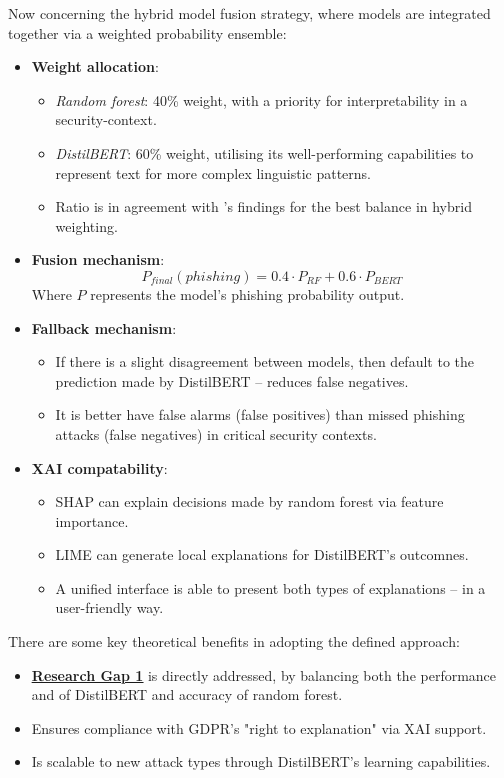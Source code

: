 \noindent Now concerning the hybrid model fusion strategy, where models are integrated together via a weighted probability ensemble:

\begin{itemize}
  \item \textbf{Weight allocation}:
  \begin{itemize}
    \item \textit{Random forest}: 40\% weight, with a priority for interpretability in a security-context.
    \item \textit{DistilBERT}: 60\% weight, utilising its well-performing capabilities to represent text for more complex linguistic patterns.
    \item Ratio is in agreement with \cite{alzahrani2024explainable}'s findings for the best balance in hybrid weighting.
  \end{itemize}
  \item \textbf{Fusion mechanism}:
  \begin{equation}
    P_{final}(phishing) = 0.4 \cdot P_{RF} + 0.6 \cdot P_{BERT}
  \end{equation}
  Where \( P \) represents the model's phishing probability output.
  \item \textbf{Fallback mechanism}:
  \begin{itemize}
    \item If there is a slight disagreement between models, then default to the prediction made by DistilBERT -- reduces false negatives.
    \item It is better have false alarms (false positives) than missed phishing attacks (false negatives) in critical security contexts.
  \end{itemize}
  \item \textbf{XAI compatability}:
  \begin{itemize}
    \item SHAP can explain decisions made by random forest via feature importance.
    \item LIME can generate local explanations for DistilBERT's outcomnes.
    \item A unified interface is able to present both types of explanations -- in a user-friendly way.
  \end{itemize}
\end{itemize}

\noindent There are some key theoretical benefits in adopting the defined approach:

\begin{itemize}
  \item \hyperref[research-gap-1]{\uline{\textbf{Research Gap 1}}} is directly addressed, by balancing both the performance and of DistilBERT and accuracy of random forest.
  \item Ensures compliance with GDPR's "right to explanation" via XAI support.
  \item Is scalable to new attack types through DistilBERT's learning capabilities.
\end{itemize}
